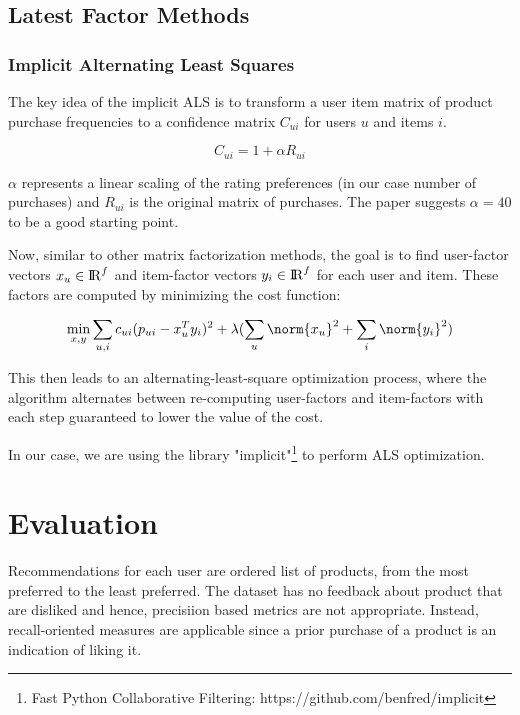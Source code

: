 \documentclass[letterpaper,12pt]{article}
\begin{document}
\subsection{Latest Factor Methods}

\subsubsection{Implicit Alternating Least Squares\cite{implicitals}}

The key idea of the implicit ALS is to transform a user item matrix of product purchase frequencies to a confidence matrix $C_{ui}$ for users $u$ and items $i$.

\begin{equation*}
	C_{ui} = 1 + \alpha R_{ui}
\end{equation*}

$\alpha$ represents a linear scaling of the rating preferences (in our case number of purchases) and $R_{ui}$ is the original matrix of purchases. The paper suggests $\alpha = 40$ to be a good starting point.

Now, similar to other matrix factorization methods, the goal is to find user-factor vectors $x_u\in{\rm I\!R}^{f}$ and item-factor vectors $y_i\in{\rm I\!R}^{f}$ for each user and item. These factors are computed by minimizing the cost function:

\begin{equation*}
	\min_{x, y} \sum_{u, i}{c_{ui}(p_{ui} - x_{u}^{T}y_{i})^2} + \lambda(\sum_{u}\norm{x_{u}}^2 + \sum_{i}\norm{y_{i}}^2)
\end{equation*}

This then leads to an alternating-least-square optimization process, where the algorithm alternates between re-computing user-factors and item-factors with each step guaranteed to lower the value of the cost.

In our case, we are using the library "implicit"\footnote{Fast Python Collaborative Filtering: https://github.com/benfred/implicit} to perform ALS optimization.

\section{Evaluation}

Recommendations for each user are ordered list of products, from the most preferred to the least preferred. The dataset has no feedback about product that are disliked and hence, precisiion based metrics are not appropriate. Instead, recall-oriented measures are applicable since a prior purchase of a product is an indication of liking it.
\end{document}
